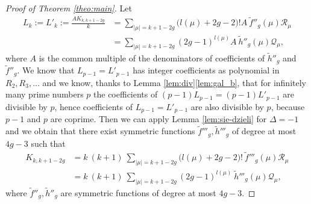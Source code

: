 \documentclass[12pt]{amsart}
\theoremstyle{plain}
\theoremstyle{remark}
\begin{document}
\begin{proof}[Proof of Theorem \ref{theo:main}]
Let 
\begin{align*}
L_k := L'_k := \frac{A K_{k,k+1-2g}}{k} &=  \sum_{|\mu|=k+1-2g}
\big(l(\mu) + 2g - 2\big)! A\ \tilde{f}''_g(\mu) \mathcal{R}_\mu \\ 
 &= \sum_{|\mu|=k+1-2g}
(2g - 1)^{l(\mu)}A\ \tilde{h}''_g(\mu) \mathcal{Q}_\mu,
\end{align*} 
where $A$ is the common multiple of the denominators of coefficients of
$\tilde{h}''_g$ and $\tilde{f}''_g$. We know that $L_{p-1} = L'_{p-1}$ has
integer coefficients as polynomial in $R_2,R_3,\dots$ and we know, thanks to
Lemma \ref{lem:div}\ref{lem:gal_b}, that for infinitely many prime
numbers $p$ the coefficients of $(p-1)L_{p-1} = (p-1)L'_{p-1}$ are divisible by $p$,
hence coefficients of $L_{p-1} = L'_{p-1}$ are also divisible by $p$, because
$p-1$ and $p$ are coprime. Then we can apply Lemma
\ref{lem:sie-dzieli} for
$\Delta=-1$ and we obtain that there exist symmetric functions $\tilde{f}'''_g,
\tilde{h}'''_g$
of degree at most $4g-3$ such that
\begin{align*}
K_{k,k+1-2g} &=  k\ (k+1)\ \sum_{|\mu|=k+1-2g}
\big(l(\mu) + 2g - 2\big)! \ \tilde{f}'''_g(\mu) \mathcal{R}_\mu \\ 
 &= k\ (k+1)\ \sum_{|\mu|=k+1-2g}
(2g - 1)^{l(\mu)}\ \tilde{h}'''_g(\mu) \mathcal{Q}_\mu,
\end{align*}
where $\tilde{f}''_g, \tilde{h}''_g$ are symmetric functions of degree at most
$4g-3$.


\end{proof}
\end{document}
